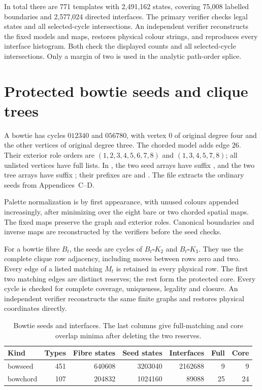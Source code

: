 In total there are 771 templates with 2,491,162 states, covering
75,008 labelled boundaries and 2,577,024 directed interfaces.
The primary verifier checks legal states and all selected-cycle
intersections. An independent verifier reconstructs the fixed models and
maps, restores physical colour strings, and reproduces every interface
histogram. Both check the displayed counts and all selected-cycle
intersections.
Only a margin of two is used in the analytic path-order splice.

\clearpage
\section{Protected bowtie seeds and clique trees}
\label{app:bowtie-certificates}
A bowtie has cycles $012340$ and $056780$, with vertex $0$ of
original degree four and the other vertices of original degree three.
The chorded model adds edge $26$. Their exterior role orders are
$(1,2,3,4,5,6,7,8)$ and $(1,3,4,5,7,8)$; all unlisted vertices
have full lists. In , the two seed arrays have
suffix , and the two tree arrays have suffix
; their prefixes are  and
. The file 
extracts the ordinary seeds from
Appendices~C--D.

Palette normalization is by first appearance, with unused colours
appended increasingly, after minimizing over the eight bare or two
chorded spatial maps. The fixed maps preserve the graph and exterior
roles. Canonical boundaries and inverse maps are reconstructed by the
verifiers before the seed checks.

For a bowtie fibre $B_t$, the seeds are cycles of
$B_t\square K_2$ and $B_t\square K_3$. They use the complete clique
row adjacency, including moves between rows zero and two. Every edge
of a listed matching $M_t$ is retained in every physical row.
The first two matching edges are distinct reserves; the rest form
the protected core. Every cycle is checked for complete coverage,
uniqueness, legality and closure. An independent verifier reconstructs the
same finite graphs and restores physical coordinates directly.

\begin{table}[htbp]
\centering\small
\caption{Bowtie seeds and interfaces. The last columns give full-matching
and core overlap minima after deleting the two reserves.}
\label{tab:bowtie-counts}
\begin{tabular}{lrrrrrr}
\toprule
Kind & Types & Fibre states & Seed states & Interfaces & Full & Core\\
\midrule
bowseed&451&640608&3203040&2162688&9&9\\
bowchord&107&204832&1024160&89088&25&24\\
\bottomrule
\end{tabular}
\end{table}

